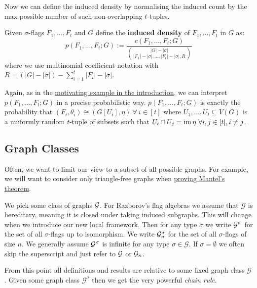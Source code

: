 Now we can define the induced density by normalising the induced count by the max
possible number of such non-overlapping $t$-tuples.

\begin{definition}
    \label{def:induced_density}
    Given $\sigma$-flags $F_1, \dots, F_t$ and $G$ define the \textbf{induced density} of
    $F_1, \dots, F_t$ in $G$ as:
    \[
    p(F_1, \dots, F_t; G)
    := \frac{c(F_1, \dots, F_t; G)}{
    \binom{|G|-|\sigma|}{|F_1|-|\sigma|, \dots,|F_t|-|\sigma|, R}}
    \]
    where we use multinomial coefficient notation with
    $R=(|G|-|\sigma|)-\sum_{i=1}^t |F_i|-|\sigma|$.
\end{definition}

\begin{note}
    Again, as in the \hyperref[sec:motivating_example]{motivating example in the introduction},
    we can interpret\\ $p(F_1, \dots, F_t; G)$ in a precise probabilistic way.
    $p(F_1, \dots, F_t; G)$ is exactly the probability that
    $(F_i, \theta_i) \cong (G[U_i], \eta)\ \forall\ i\in[t]$ where
    $U_1, \dots, U_t \subseteq V(G)$ is a uniformly random $t$-tuple of subsets such that
    $U_i \cap U_j = \im \eta\ \forall i, j \in [t], i \neq j$.
\end{note}

\subsection{Graph Classes}

Often, we want to limit our view to a subset of all possible graphs. For example, we
will want to consider only triangle-free graphs when
\hyperref[example:first_mantels_proof]{proving Mantel's theorem}.

We pick some class of graphs $\mathcal{G}$. For Razborov's flag algebras we assume that
$\mathcal{G}$ is hereditary, meaning it is closed under taking induced subgraphs. This will change
when we introduce our new local framework.
Then for any type $\sigma$ we write $\mathcal{G}^\sigma$ for the set of all $\sigma$-flags up to
isomorphism. We write $\mathcal{G}^\sigma_n$ for the set of all $\sigma$-flags of size $n$.
We generally assume $\mathcal{G}^\sigma$ is infinite for any type $\sigma\in\mathcal{G}$.
If $\sigma=\emptyset$ we often skip the superscript and just refer to
$\mathcal{G}$ or $\mathcal{G}_n$.

From this point all definitions and results are relative to some fixed graph class
$\mathcal{G}$. Given some graph class $\mathcal{G}^\sigma$ then we get the very powerful
\textit{chain rule}.

